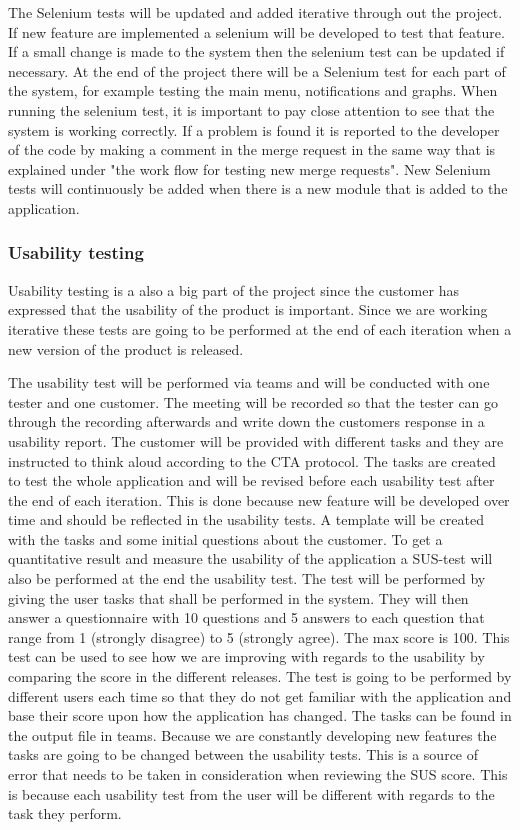 \noindent The Selenium tests will be updated and added iterative through out the project. If new feature are implemented a selenium will be developed to test that feature. If a small change is made to the system then the selenium test can be updated if necessary. At the end of the project there will be a Selenium test for each part of the system, for example testing the main menu, notifications and graphs. When running the selenium test, it is important to pay close attention to see that the system is working correctly. If a problem is found it is reported to the developer of the code by making a comment in the merge request in the same way that is explained under "the work flow for testing new merge requests". New Selenium tests will continuously be added when there is a new module that is added to the application. \\

\subsubsection{Usability testing}
 Usability testing is a also a big part of the project since the customer has expressed that the usability of the product is important. Since we are working iterative these tests are going to be performed at the end of each iteration when a new version of the product is released. \newline

\noindent The usability test will be performed via teams and will be conducted with one tester and one customer. The meeting will be recorded so that the tester can go through the recording afterwards and write down the customers response in a usability report. The customer will be provided with different tasks and they are instructed to think aloud according to the CTA protocol. The tasks are created to test the whole application and will be revised before each usability test after the end of each iteration. This is done because new feature will be developed over time and should be reflected in the usability tests. A template will be created with the tasks and some initial questions about the customer. To get a quantitative result and measure the usability of the application a SUS-test will also be performed at the end the usability test. The test will be performed by giving the user tasks that shall be performed in the system. They will then answer a questionnaire with 10 questions and 5 answers to each question that range from 1 (strongly disagree) to 5 (strongly agree). The max score is 100. This test can be used to see how we are improving with regards to the usability by comparing the score in the different releases. The test is going to be performed by different users each time so that they do not get familiar with the application and base their score upon how the application has changed. The tasks can be found in the output file in teams. Because we are constantly developing new features the tasks are going to be changed between the usability tests. This is a source of error that needs to be taken in consideration when reviewing the SUS score. This is because each usability test from the user will be different with regards to the task they perform.\newline

